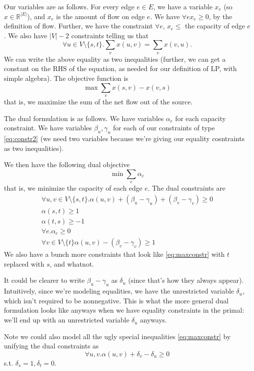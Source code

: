 \documentclass{article}
\begin{document}
Our variables are as follows.
For every edge $e\in E$, we have a variable $x_e$ (so $x\in\mathbb R^{|E|}$),
and $x_e$ is the amount of flow on edge $e$.
We have $\forall e x_e \geq 0$, by the definition of flow.
Further, we have the constraint
$\forall e$, $x_e \leq$ the capacity of edge $e$.
We also have $|V| - 2$ constraints telling us that 
\begin{equation}
\forall u \in V \setminus \{s,t\}. \sum_v x(u,v) = \sum_v x(v,u).
\label{eq:constr2}
\end{equation}
We can write the above equality as two inequalities (further, we can
get a constant on the RHS of the equation, as needed for our definition of
LP, with simple algebra).
The objective function is
$$
\max \sum_v x(s,v) - x(v,s)
$$
that is, we maximize the sum of the net flow out of the source.

The dual formulation is as follows. 
We have variables $\alpha_e$ for each capacity constraint.
We have variables $\beta_u, \gamma_u$ for each of our constraints of
type \eqref{eq:constr2} (we need two variables because we're giving our
equality cosntraints as two inequalities).

We then have the following dual objective
$$
\min \sum_e \alpha_e
$$
that is, we minimize the capacity of each edge $e$.
The dual constraints are
\begin{align}
\forall u,v\in V\setminus\{s,t\}.
\alpha(u,v) + (\beta_u - \gamma_u) + (\beta_v - \gamma_v) \geq 0 \\
\alpha(s,t) \geq 1 \\
\alpha(t,s) \geq -1 \\
\forall e. \alpha_e \geq 0 \\
\forall v \in V\setminus\{t\}
\alpha(u,v) - (\beta_v - \gamma_v) \geq 1 \label{eq:maxconstr}
\end{align}
We also have a bunch more constraints that look like \eqref{eq:maxconstr}
with $t$ replaced with $s$, and whatnot.

It could be clearer to write $\beta_u - \gamma_u$ as $\delta_u$ (since that's
how they always appear).
Intuitively, since we're modeling equalities, we have the unrestricted
variable $\delta_u$, which isn't required to be nonnegative.
This is what the more general dual formulation looks like anyways when
we have equality constraints in the primal: we'll end up with an unrestricted
variable $\delta_u$ anyways.

Note we could also model all the ugly special inequalities \eqref{eq:maxconstr}
by unifying the dual constraints as
$$
\forall u,v. \alpha(u,v) + \delta_v - \delta_u \geq 0
$$
s.t. $\delta_s = 1, \delta_t = 0$.
\end{document}
